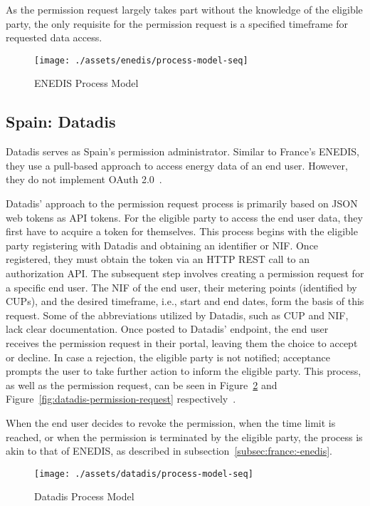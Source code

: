 As the permission request largely takes part without the knowledge of the eligible party,
the only requisite for the permission request is a specified timeframe for requested data access.

\begin{figure}[h]
    \texttt{[image: ./assets/enedis/process-model-seq]}
    \caption{ENEDIS Process Model}
    \label{fig:enedis-process-model}
\end{figure}

\subsection{Spain: Datadis}\label{subsec:spain:-datadis}
Datadis serves as Spain's permission administrator.
Similar to France's ENEDIS, they use a pull-based approach to access energy data of an end user.
However, they do not implement OAuth 2.0~\cite{datadis-dev-guide}.

Datadis' approach to the permission request process is primarily based on JSON web tokens as API tokens.
For the eligible party to access the end user data, they first have to acquire a token for themselves.
This process begins with the eligible party registering with Datadis and obtaining an identifier or NIF.
Once registered, they must obtain the token via an HTTP REST call to an authorization API.
The subsequent step involves creating a permission request for a specific end user.
The NIF of the end user, their metering points (identified by CUPs),
and the desired timeframe, i.e., start and end dates, form the basis of this request.
Some of the abbreviations utilized by Datadis, such as CUP and NIF, lack clear documentation.
Once posted to Datadis' endpoint, the end user receives the permission request in their portal,
leaving them the choice to accept or decline.
In case a rejection, the eligible party is not notified;
acceptance prompts the user to take further action to inform the eligible party.
This process, as well as the permission request,
can be seen in Figure~\ref{fig:datadis-process-model} and Figure~\ref{fig:datadis-permission-request} respectively~\cite{datadis-dev-guide,bprt-issues}.

When the end user decides to revoke the permission,
when the time limit is reached, or when the permission is terminated by the eligible party,
the process is akin to that of ENEDIS,
as described in subsection~\ref{subsec:france:-enedis}.

\begin{figure}[h]
    \texttt{[image: ./assets/datadis/process-model-seq]}
    \caption{Datadis Process Model}
    \label{fig:datadis-process-model}
\end{figure}

